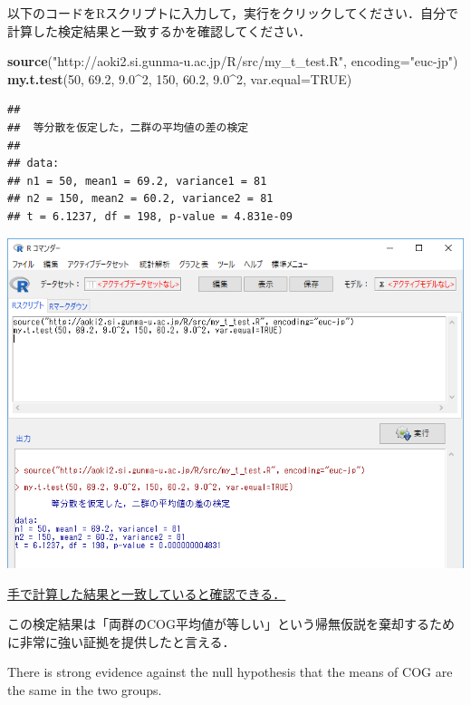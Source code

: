 \documentclass[11pt,]{problemset}
\newenvironment{Shaded}{\begin{snugshade}}{\end{snugshade}}
\newcommand{\DataTypeTok}[1]{\textcolor[rgb]{0.13,0.29,0.53}{#1}}
\newcommand{\DecValTok}[1]{\textcolor[rgb]{0.00,0.00,0.81}{#1}}
\newcommand{\FloatTok}[1]{\textcolor[rgb]{0.00,0.00,0.81}{#1}}
\newcommand{\KeywordTok}[1]{\textcolor[rgb]{0.13,0.29,0.53}{\textbf{#1}}}
\newcommand{\NormalTok}[1]{#1}
\newcommand{\OperatorTok}[1]{\textcolor[rgb]{0.81,0.36,0.00}{\textbf{#1}}}
\newcommand{\OtherTok}[1]{\textcolor[rgb]{0.56,0.35,0.01}{#1}}
\newcommand{\StringTok}[1]{\textcolor[rgb]{0.31,0.60,0.02}{#1}}
\begin{document}
以下のコードをRスクリプトに入力して，実行をクリックしてください．自分で計算した検定結果と一致するかを確認してください．

\begin{Shaded}
\begin{Highlighting}[]
\KeywordTok{source}\NormalTok{(}\StringTok{"http://aoki2.si.gunma-u.ac.jp/R/src/my_t_test.R"}\NormalTok{, }\DataTypeTok{encoding=}\StringTok{"euc-jp"}\NormalTok{)}
\KeywordTok{my.t.test}\NormalTok{(}\DecValTok{50}\NormalTok{, }\FloatTok{69.2}\NormalTok{, }\FloatTok{9.0}\OperatorTok{^}\DecValTok{2}\NormalTok{, }\DecValTok{150}\NormalTok{, }\FloatTok{60.2}\NormalTok{, }\FloatTok{9.0}\OperatorTok{^}\DecValTok{2}\NormalTok{, }\DataTypeTok{var.equal=}\OtherTok{TRUE}\NormalTok{)}
\end{Highlighting}
\end{Shaded}

\begin{verbatim}
## 
##  等分散を仮定した，二群の平均値の差の検定
## 
## data:  
## n1 = 50, mean1 = 69.2, variance1 = 81
## n2 = 150, mean2 = 60.2, variance2 = 81
## t = 6.1237, df = 198, p-value = 4.831e-09
\end{verbatim}

\begin{center}\includegraphics[width=0.9\linewidth]{pic/myttest01} \end{center}
\bigskip

\underline{手で計算した結果と一致していると確認できる．}

この検定結果は「両群のCOG平均値が等しい」という帰無仮説を棄却するために非常に強い証拠を提供したと言える．

There is strong evidence against the null hypothesis that the means of
COG are the same in the two groups.
\end{document}
